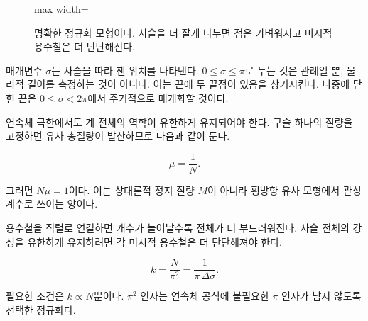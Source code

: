 \begin{figure}[H]
  \centering
  \begin{adjustbox}{max width=\linewidth}
  \end{adjustbox}
  \caption{명확한 정규화 모형이다. 사슬을 더 잘게 나누면 점은 가벼워지고 미시적 용수철은 더 단단해진다.}
  \label{fig:l02-chain-redraw}
\end{figure}

매개변수 \(\sigma\)는 사슬을 따라 잰 위치를 나타낸다. \(0\leq\sigma\leq\pi\)로 두는 것은 관례일 뿐, 물리적 길이를 측정하는 것이 아니다. 이는 끈에 두 끝점이 있음을 상기시킨다. 나중에 닫힌 끈은 \(0\leq\sigma<2\pi\)에서 주기적으로 매개화할 것이다.

연속체 극한에서도 계 전체의 역학이 유한하게 유지되어야 한다. 구슬 하나의 질량을 고정하면 유사 총질량이 발산하므로 다음과 같이 둔다.

\begin{equation}
  \mu=\frac{1}{N}.
  \label{eq:l02-mu-scaling}
\end{equation}

그러면 \(N\mu=1\)이다. 이는 상대론적 정지 질량 \(M\)이 아니라 횡방향 유사 모형에서 관성 계수로 쓰이는 양이다.

용수철을 직렬로 연결하면 개수가 늘어날수록 전체가 더 부드러워진다. 사슬 전체의 강성을 유한하게 유지하려면 각 미시적 용수철은 더 단단해져야 한다.

\begin{equation}
  k=\frac{N}{\pi^2}
  =\frac{1}{\pi\,\Delta\sigma}.
  \label{eq:l02-k-scaling}
\end{equation}

필요한 조건은 \(k\propto N\)뿐이다. \(\pi^2\) 인자는 연속체 공식에 불필요한 \(\pi\) 인자가 남지 않도록 선택한 정규화다.

\begin{classroomqa}
\end{classroomqa}

